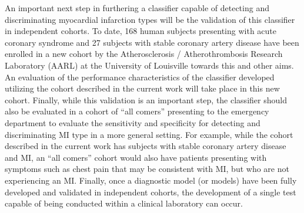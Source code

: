 \begin{DoubleSpace*}
An important next step in furthering a classifier capable of detecting and discriminating myocardial infarction types will be the validation of this classifier in independent cohorts. To date, 168 human subjects presenting with acute coronary syndrome and 27 subjects with stable coronary artery disease have been enrolled in a new cohort by the Atherosclerosis / Atherothrombosis Research Laboratory (AARL) at the University of Louisville towards this and other aims. An evaluation of the performance characteristics of the classifier developed utilizing the cohort described in the current work will take place in this new cohort. Finally, while this validation is an important step, the classifier should also be evaluated in a cohort of ``all comers'' presenting to the emergency department to evaluate the sensitivity and specificity for detecting and discriminating MI type in a more general setting. For example, while the cohort described in the current work has subjects with stable coronary artery disease and MI, an ``all comers'' cohort would also have patients presenting with symptoms such as chest pain that may be consistent with MI, but who are not experiencing an MI. Finally, once a diagnostic model (or models) have been fully developed and validated in independent cohorts, the development of a single test capable of being conducted within a clinical laboratory can occur. 

\end{DoubleSpace*}
